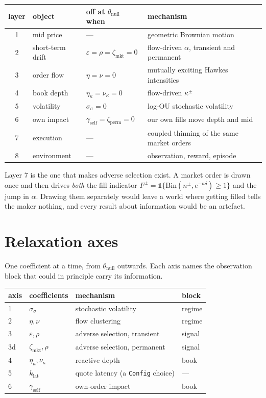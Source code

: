 \documentclass[11pt,a4paper]{article}
\newcommand{\thnull}{\theta_{\mathrm{null}}}
\begin{document}
\begin{center}\small
\begin{tabular}{@{}clll@{}}
\toprule
layer & object & off at $\thnull$ when & mechanism \\
\midrule
1 & mid price & --- & geometric Brownian motion \\
2 & short-term drift & $\varepsilon=\rho=\zeta_{\mathrm{mkt}}=0$ & flow-driven $\alpha$, transient and permanent \\
3 & order flow & $\eta=\nu=0$ & mutually exciting Hawkes intensities \\
4 & book depth & $\eta_\kappa=\nu_\kappa=0$ & flow-driven $\kappa^\pm$ \\
5 & volatility & $\sigma_\sigma=0$ & log-OU stochastic volatility \\
6 & own impact & $\gamma_{\mathrm{self}}=\zeta_{\mathrm{perm}}=0$ & our own fills move depth and mid \\
7 & execution & --- & coupled thinning of the same market orders \\
8 & environment & --- & observation, reward, episode \\
\bottomrule
\end{tabular}
\end{center}

Layer 7 is the one that makes adverse selection exist. A market order is drawn
once and then drives \emph{both} the fill indicator
$F^{\pm} = \mathbb{1}\{\mathrm{Bin}(n^{\pm}, e^{-\kappa\delta}) \ge 1\}$ and the jump
in $\alpha$. Drawing them separately would leave a world where getting filled
tells the maker nothing, and every result about information would be an artefact.

\section{Relaxation axes}

One coefficient at a time, from $\thnull$ outwards. Each axis names the
observation block that could in principle carry its information.

\begin{center}\small
\begin{tabular}{@{}llll@{}}
\toprule
axis & coefficients & mechanism & block \\
\midrule
1 & $\sigma_\sigma$ & stochastic volatility & regime \\
2 & $\eta,\nu$ & flow clustering & regime \\
3 & $\varepsilon,\rho$ & adverse selection, transient & signal \\
3d & $\zeta_{\mathrm{mkt}},\rho$ & adverse selection, permanent & signal \\
4 & $\eta_\kappa,\nu_\kappa$ & reactive depth & book \\
5 & $k_{\mathrm{lat}}$ & quote latency (a \texttt{Config} choice) & --- \\
6 & $\gamma_{\mathrm{self}}$ & own-order impact & book \\
\bottomrule
\end{tabular}
\end{center}
\end{document}
